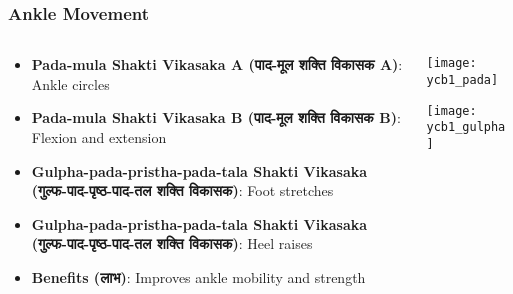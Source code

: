 \begin{frame}[fragile]\frametitle{Ankle Movement}
 \begin{columns}
    \begin{column}[T]{0.5\linewidth}
      \begin{itemize}
		\item \textbf{Pada-mula Shakti Vikasaka A (पाद-मूल शक्ति विकासक A)}: Ankle circles
		\item \textbf{Pada-mula Shakti Vikasaka B (पाद-मूल शक्ति विकासक B)}: Flexion and extension
		\item \textbf{Gulpha-pada-pristha-pada-tala Shakti Vikasaka (गुल्फ-पाद-पृष्ठ-पाद-तल शक्ति विकासक)}: Foot stretches
		\item \textbf{Gulpha-pada-pristha-pada-tala Shakti Vikasaka (गुल्फ-पाद-पृष्ठ-पाद-तल शक्ति विकासक)}: Heel raises
		\item \textbf{Benefits (लाभ)}: Improves ankle mobility and strength
	  \end{itemize}
    \end{column}
    \begin{column}[T]{0.5\linewidth}
		\begin{center}
		\texttt{[image: ycb1\_pada]}
		
		
		\texttt{[image: ycb1\_gulpha]}
		
		\end{center}	
    \end{column}
\end{columns}
\end{frame}


